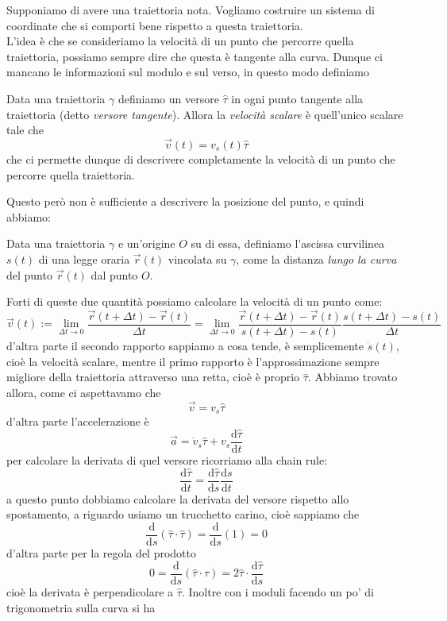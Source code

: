 \documentclass[11pt]{scrartcl}
\newcommand{\dif}{\text{d}}
\begin{document}
	Supponiamo di avere una traiettoria nota. Vogliamo costruire un sistema di coordinate che si comporti bene rispetto a questa traiettoria. \\
	L'idea è che se consideriamo la velocità di un punto che percorre quella traiettoria,  possiamo sempre dire che questa è tangente alla curva. Dunque ci mancano le informazioni sul modulo e sul verso, in questo modo definiamo
	\begin{definition}
		Data una traiettoria $\gamma$ definiamo un versore $\hat{\tau}$ in ogni punto tangente alla traiettoria (detto \textit{versore tangente}). Allora la \textit{velocità scalare} è quell'unico scalare tale che 
		$$\vec{v}(t)=v_s(t)\hat{\tau}$$
		che ci permette dunque di descrivere completamente la velocità di un punto che percorre quella traiettoria.
	\end{definition} 
	Questo però non è sufficiente a descrivere la posizione del punto, e quindi abbiamo:
	\begin{definition}
		Data una traiettoria $\gamma$ e un'origine $O$ su di essa, definiamo l'ascissa curvilinea $s(t)$ di una legge oraria $\vec{r}(t)$ vincolata su $\gamma$, come la distanza \textit{lungo la curva} del punto $\vec{r}(t)$ dal punto $O$.
	\end{definition}
	Forti di queste due quantità possiamo calcolare la velocità di un punto come:
	$$\vec{v}(t):=\lim_{\Delta t \to 0}\frac{\vec{r}(t+\Delta t)-\vec{r}(t)}{\Delta t}=\lim_{\Delta t \to 0}\frac{\vec{r}(t+\Delta t)-\vec{r}(t)}{s(t+\Delta t)-s(t)}\frac{s(t+\Delta t)-s(t)}{\Delta t}$$
	d'altra parte il secondo rapporto sappiamo a cosa tende, è semplicemente $\dot{s}(t)$, cioè la velocità scalare, mentre il primo rapporto è l'approssimazione sempre migliore della traiettoria attraverso una retta, cioè è proprio $\hat{\tau}$. Abbiamo trovato allora, come ci aspettavamo che 
	$$\vec{v}=v_s \hat{\tau}$$
	d'altra parte l'accelerazione è
	$$\vec{a}=\dot{v}_s\hat{\tau}+v_s\frac{\dif \hat{\tau}}{\dif t}$$
	per calcolare la derivata di quel versore ricorriamo alla chain rule:
	$$\frac{\dif \hat{\tau}}{\dif t}=\frac{\dif \hat{\tau}}{\dif s}\frac{\dif s}{\dif t}$$
	a questo punto dobbiamo calcolare la derivata del versore rispetto allo spostamento, a riguardo usiamo un trucchetto carino, cioè sappiamo che
	$$\frac{\dif}{\dif s}(\hat{\tau}\cdot \hat{\tau})=\frac{\dif}{\dif s}(1)=0$$
	d'altra parte per la regola del prodotto
	$$0=\frac{\dif}{\dif s}(\hat{\tau}\cdot \hat{\tau})=2\hat{\tau}\cdot \frac{\dif \hat{\tau}}{\dif s}$$
	cioè la derivata è perpendicolare a $\hat{\tau}$. Inoltre con i moduli facendo un po' di trigonometria sulla curva si ha
\end{document}
